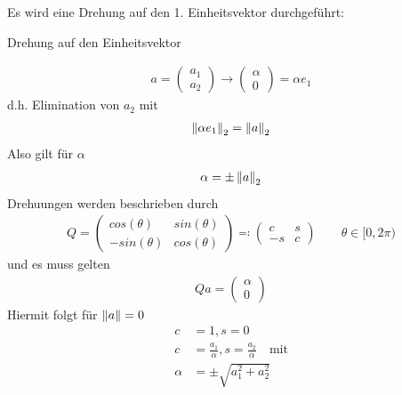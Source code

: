 Es wird eine Drehung auf den 1. Einheitsvektor durchgeführt:
\begin{image}{Drehung auf den Einheitsvektor}
    \label{im4.4.a}
\end{image}
\begin{gather*}
  a=\begin{pmatrix}a_1 \\ a_2\end{pmatrix} \rightarrow \begin{pmatrix}\alpha \\ 0 \end{pmatrix}
  = \alpha e_1
\end{gather*}
d.h. Elimination von $a_2$ mit
\begin{gather*}
  \left\| \alpha e_1 \right\|_2 = \left\| a \right\|_2
\end{gather*}
Also gilt für $\alpha$
\begin{gather*}
  \alpha=\pm \left\| a \right\|_2
\end{gather*}
Drehuungen werden beschrieben durch
\begin{gather*}
  Q = \begin{pmatrix}
    cos(\theta) & sin(\theta)\\
    -sin(\theta) & cos(\theta)
  \end{pmatrix}
  \eqqcolon \begin{pmatrix}
    c & s\\
    -s & c
  \end{pmatrix}\qquad \theta \in[0,2\pi)
\end{gather*}
und es muss gelten
\begin{gather*}
  Qa = \begin{pmatrix}\alpha \\ 0 \end{pmatrix}
\end{gather*}
Hiermit folgt für $\left\| a \right\|= 0$
\begin{align}
  \nonumber
  c&=1, s=0\\ \nonumber
  c&=\frac{a_1}{\alpha},  s= \frac{a_2}{\alpha}\quad \text{mit}\\
  \alpha & = \pm \sqrt{a_1^2+a_2^2}
           \label{IV.4.4}
\end{align}
